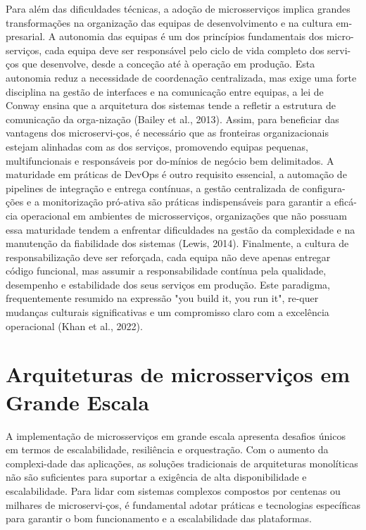 Para além das dificuldades técnicas, a adoção de microsserviços implica grandes transformações na organização das equipas de desenvolvimento e na cultura em-presarial. A autonomia das equipas é um dos princípios fundamentais dos micro-serviços, cada equipa deve ser responsável pelo ciclo de vida completo dos servi-ços que desenvolve, desde a conceção até à operação em produção. Esta autonomia reduz a necessidade de coordenação centralizada, mas exige uma forte disciplina na gestão de interfaces e na comunicação entre equipas, a lei de Conway ensina que a arquitetura dos sistemas tende a refletir a estrutura de comunicação da orga-nização (Bailey et al., 2013). Assim, para beneficiar das vantagens dos microservi-ços, é necessário que as fronteiras organizacionais estejam alinhadas com as dos serviços, promovendo equipas pequenas, multifuncionais e responsáveis por do-mínios de negócio bem delimitados.
A maturidade em práticas de DevOps é outro requisito essencial, a automação de pipelines de integração e entrega contínuas, a gestão centralizada de configura-ções e a monitorização pró-ativa são práticas indispensáveis para garantir a eficá-cia operacional em ambientes de microsserviços, organizações que não possuam essa maturidade tendem a enfrentar dificuldades na gestão da complexidade e na manutenção da fiabilidade dos sistemas (Lewis, 2014).
Finalmente, a cultura de responsabilização deve ser reforçada, cada equipa não deve apenas entregar código funcional, mas assumir a responsabilidade contínua pela qualidade, desempenho e estabilidade dos seus serviços em produção. Este paradigma, frequentemente resumido na expressão "you build it, you run it", re-quer mudanças culturais significativas e um compromisso claro com a excelência operacional (Khan et al., 2022).

\section{Arquiteturas de microsserviços em Grande Escala}

A implementação de microsserviços em grande escala apresenta desafios únicos em termos de escalabilidade, resiliência e orquestração. Com o aumento da complexi-dade das aplicações, as soluções tradicionais de arquiteturas monolíticas não são suficientes para suportar a exigência de alta disponibilidade e escalabilidade. Para lidar com sistemas complexos compostos por centenas ou milhares de microservi-ços, é fundamental adotar práticas e tecnologias específicas para garantir o bom funcionamento e a escalabilidade das plataformas.

